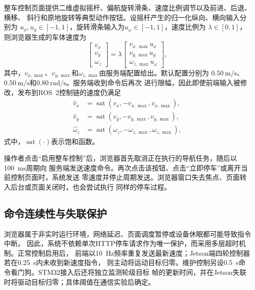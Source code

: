 \documentclass[UTF8,12pt,a4paper,openany]{ctexbook}
\begin{document}
整车控制页面提供二维虚拟摇杆、偏航旋转滑条、速度比例调节以及前进、后退、横移、
斜行和原地旋转等典型动作按钮。设摇杆产生的归一化纵向、横向输入分别为
$u_x,u_y\in[-1,1]$，旋转滑条输入为$u_\omega\in[-1,1]$，速度比例为
$\lambda\in[0,1]$，则浏览器生成的车体速度为
\begin{equation}
    \begin{bmatrix}
        v_x\\v_y\\\omega_z
    \end{bmatrix}
    =
    \lambda
    \begin{bmatrix}
        v_{x,\max}u_x\\
        v_{y,\max}u_y\\
        \omega_{z,\max}u_\omega
    \end{bmatrix},
    \label{eq:web-normalized-command}
\end{equation}
其中，$v_{x,\max}$、$v_{y,\max}$和$\omega_{z,\max}$由服务端配置给出。默认配置分别为
$0.50~\mathrm{m/s}$、$0.50~\mathrm{m/s}$和$0.80~\mathrm{rad/s}$。服务端收到命令后再次
进行限幅，因此即使前端输入被修改，发布到ROS~2控制链的速度仍满足
\begin{equation}
\begin{aligned}
    \hat v_x &= \operatorname{sat}(v_x,-v_{x,\max},v_{x,\max}),\\
    \hat v_y &= \operatorname{sat}(v_y,-v_{y,\max},v_{y,\max}),\\
    \hat\omega_z &= \operatorname{sat}(\omega_z,-\omega_{z,\max},\omega_{z,\max}),
\end{aligned}
\label{eq:web-server-saturation}
\end{equation}
式中，$\operatorname{sat}(\cdot)$表示饱和函数。

操作者点击“启用整车控制”后，浏览器首先取消正在执行的导航任务，随后以100~ms周期向
服务端发送速度命令。再次点击该按钮、点击“立即停车”或离开当前控制页面时，系统发送
零速度并停止周期发送。浏览器窗口失去焦点、页面转入后台或页面关闭时，也会尝试执行
同样的停车过程。

\subsection{命令连续性与失联保护}

浏览器属于非实时运行环境，网络延迟、页面调度暂停或设备休眠都可能导致指令中断。
因此，系统不依赖单次HTTP停车请求作为唯一保护，而采用多层超时机制。正常控制启用后，
前端以10~Hz频率重复发送最新速度；Jetson端四轮控制器若在0.25~s内未收到新速度指令，
则主动将运动目标归零。维护控制另设0.5~s命令看门狗。STM32接入后还将独立监测轮级目标
帧的更新时间，并在Jetson失联时将驱动目标归零；具体阈值在通信实验后确定。
\end{document}
